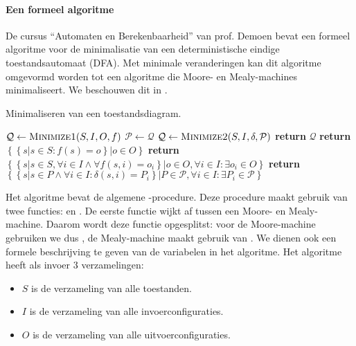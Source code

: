 \paragraph{Een formeel algoritme}
De cursus ``Automaten en Berekenbaarheid'' van prof. Demoen\cite{aenb10} bevat een formeel algoritme voor de minimalisatie van een deterministische eindige toestandsautomaat (DFA). Met minimale veranderingen kan dit algoritme omgevormd worden tot een algoritme die Moore- en Mealy-machines minimaliseert. We beschouwen dit in .
\begin{algorithm}[hbt]
\caption{Minimaliseren van een toestandsdiagram.}\label{alg:minimizeFSM}
\begin{algorithmic}[1]
\State $\mathcal{Q}\gets\Call{Minimize1}{S,I,O,f}$
\Repeat
\State $\mathcal{P}\gets\mathcal{Q}$
\State $\mathcal{Q}\gets\Call{Minimize2}{S,I,\delta,\mathcal{P}}$
\State \textbf{return} $\mathcal{Q}$
\EndProcedure
{}
\State \textbf{return} $\left\{\left\{s|s\in S:f\left(s\right)=o\right\}|o\in O\right\}$
\EndFunction
{}
\State \textbf{return} $\left\{\left\{s|s\in S,\forall i\in I\wedge\forall f\left(s,i\right)=o_i\right\}|o\in O,\forall i\in I:\exists o_i\in O\right\}$
\EndFunction
{}
\State \textbf{return} $\left\{\left\{s|s\in P\wedge \forall i \in I:\delta\left(s,i\right)=P_i\right\}|P\in\mathcal{P},\forall i\in I:\exists P_i\in\mathcal{P}\right\}$
\EndFunction
\end{algorithmic}
\end{algorithm}
Het algoritme bevat de algemene -procedure. Deze procedure maakt gebruik van twee functies:  en . De eerste functie wijkt af tussen een Moore- en Mealy-machine. Daarom wordt deze functie opgesplitst: voor de Moore-machine gebruiken we dus , de Mealy-machine maakt gebruik van . We dienen ook een formele beschrijving te geven van de variabelen in het algoritme. Het algoritme heeft als invoer 3 verzamelingen:
\begin{itemize}
 \item $S$ is de verzameling van alle toestanden.
 \item $I$ is de verzameling van alle invoerconfiguraties.
 \item $O$ is de verzameling van alle uitvoerconfiguraties.
\end{itemize}

